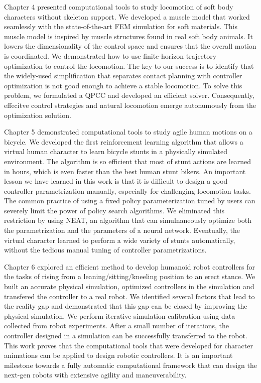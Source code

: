 Chapter 4 presented computational tools to study locomotion of soft body characters without skeleton support. We developed a muscle model that worked seamlessly with the state-of-the-art FEM simulation for soft materials. This muscle model is inspired by muscle structures found in real soft body animals. It lowers the dimensionality of the control space and ensures that the overall motion is coordinated. We demonstrated how to use finite-horizon trajectory optimization to control the locomotion. The key to our success is to identify that the widely-used simplification that separates contact planning with controller optimization is not good enough to achieve a stable locomotion. To solve this problem, we formulated a QPCC and developed an efficient solver. Consequently, effecitve control strategies and natural locomotion emerge autonumously from the optimization solution.

Chapter 5 demonstrated computational tools to study agile human motions on a bicycle. We developed the first reinforcement learning algorithm that allows a virtual human character to learn bicycle stunts in a physically simulated environment. The algorithm is so efficient that most of stunt actions are learned in hours, which is even faster than the best human stunt bikers. An important lesson we have learned in this work is that it is difficult to design a good controller parametrization manually, especially for challenging locomotion tasks. The common practice of using a fixed policy parameterization tuned by users can severely limit the power of policy search algorithms. We eliminated this restriction by using NEAT, an algorithm that can simulnaneously optimize both the parametrization and the parameters of a neural network. Eventually, the virtual character learned to perform a wide variety of stunts automatically, without the tedious manual tuning of controller parametrizations.

Chapter 6 explored an efficient method to develop humanoid robot controllers for the tasks of rising from a leaning/sitting/kneeling position to an erect stance. We built an accurate physical simulation, optimized controllers in the simulation and transfered the controller to a real robot. We identified several factors that lead to the reality gap and demonstrated that this gap can be closed by improving the physical simulation. We perform iterative simulation calibration using data collected from robot experiments. After a small number of iterations, the controller designed in a simulation can be successfully transferred to the robot. This work proves that the computational tools that were developed for character animations can be applied to design robotic controllers. It is an important milestone towards a fully automatic computational framework that can design the next-gen robots with extensive agility and maneuverability.

